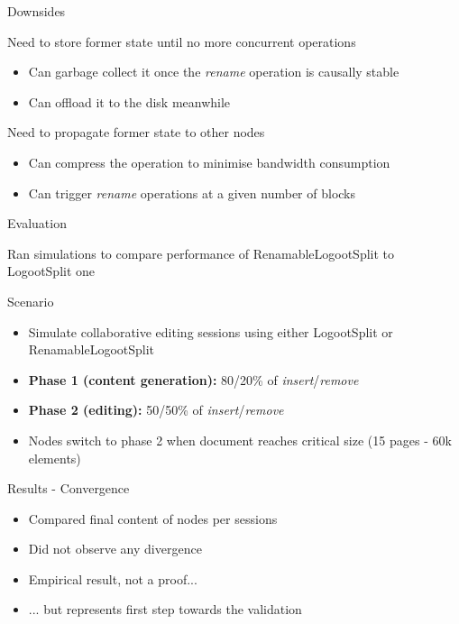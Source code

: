 \documentclass[10pt]{beamer}
\begin{document}
\begin{frame}{Downsides}
  \begin{block}{Need to store former state until no more concurrent operations}
    \begin{itemize}
      \item Can garbage collect it once the \emph{rename} operation is causally stable 
      \item Can offload it to the disk meanwhile
    \end{itemize}
  \end{block}

  \begin{block}{Need to propagate former state to other nodes}
    \begin{itemize}
      \item Can compress the operation to minimise bandwidth consumption
      \item Can trigger \emph{rename} operations at a given number of blocks
    \end{itemize}
  \end{block}
\end{frame}

\begin{frame}[standout]
  \alert{Evaluation}

  \bigskip
  Ran simulations to compare performance of RenamableLogootSplit to LogootSplit one
\end{frame}

\begin{frame}{Scenario}
  \begin{itemize}
    \item Simulate collaborative editing sessions using either LogootSplit or RenamableLogootSplit
    \item \textbf{Phase 1 (content generation):} 80/20\% of \emph{insert}/\emph{remove}
    \item \textbf{Phase 2 (editing):} 50/50\% of \emph{insert}/\emph{remove}
    \item Nodes switch to phase 2 when document reaches critical size (15 pages - 60k elements)
  \end{itemize}
\end{frame}

\begin{frame}{Results - Convergence}
  \begin{itemize}
    \item Compared final content of nodes per sessions
    \item Did not observe any divergence
    \bigskip
    \item Empirical result, not a proof...
    \item ... but represents first step towards the validation
  \end{itemize}
\end{frame}
\end{document}
